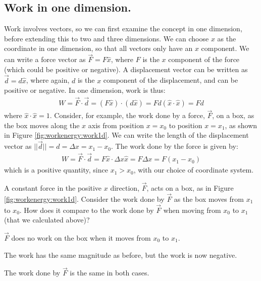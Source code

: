 \subsection{Work in one dimension.}
Work involves vectors, so we can first examine the concept in one dimension, before extending this to two and three dimensions. We can choose $x$ as the coordinate in one dimension, so that all vectors only have an $x$ component. We can write a force vector as $\vec F=F\hat x$, where $F$ is the $x$ component of the force (which could be positive or negative). A displacement vector can be written as $\vec d = d \hat x$, where again, $d$ is the $x$ component of the displacement, and can be positive or negative. In one dimension, work is thus:
\begin{align*}
W = \vec F \cdot \vec d = (F\hat x) \cdot ( d\hat x ) = Fd (\hat x\cdot\hat x)=Fd
\end{align*}
where $\hat x \cdot \hat x = 1$. Consider, for example, the work done by a force, $\vec F$, on a box, as the box moves along the $x$ axis from position $x=x_0$ to position $x=x_1$, as shown in Figure \ref{fig:workenergy:work1d}.
We can write the length of the displacement vector as $||\vec d|| =d= \Delta x = x_1-x_0$. The work done by the force is given by:
\begin{align*}
W = \vec F \cdot \vec d = F\hat x\cdot \Delta x\hat x =F\Delta x =F(x_1-x_0) 
\end{align*}
which is a positive quantity, since $x_1 > x_0$, with our choice of coordinate system. 

\begin{checkpoint}
\begin{MCquestion}
{A constant force in the positive $x$ direction, $\vec F$, acts on a box, as in Figure \ref{fig:workenergy:work1d}. Consider the work done by $\vec F$ as the box moves from $x_1$ to $x_0$. How does it compare to the work done by $\vec F$ when moving from $x_0$ to $x_1$ (that we calculated above)?}
\item $\vec F$ does no work on the box when it moves from $x_0$ to $x_1$. 
\item The work has the same magnitude as before, but the work is now negative. \correct
\item The work done by $\vec F$ is the same in both cases.
\end{MCquestion}
\end{checkpoint}

